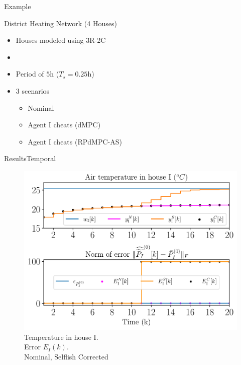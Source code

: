 \documentclass[aspectratio=169]{beamer}
\begin{document}
\begin{frame}{Example}
\begin{minipage}[c]{.35\textwidth}
{\begin{tikzpicture}[node distance=.5cm and .75cm,scale=1]
      \end{tikzpicture}
    }
  \end{minipage}
  \hfill
  \begin{minipage}[c]{.6\textwidth}
    \begin{exampleblock}{District Heating Network (4 Houses)}
      \begin{itemize}
        \item Houses modeled using 3R-2C
        \item {}
        \item Period of ${5} \mathrm{h}$ (${T_{s}=0.25\mathrm{h}}$)
        \item 3 scenarios
              \begin{itemize}
                \item[\encircle{N}] Nominal
                \item[\encircle{C}] Agent I cheats (dMPC)
                \item[\encircle{S}] Agent I cheats (RPdMPC-AS)
              \end{itemize}
      \end{itemize}
    \end{exampleblock}
  \end{minipage}
\end{frame}

\begin{frame}{Results}{Temporal}
  \begin{figure}[h]
    \centering
    \includegraphics[width=.5\textwidth,trim=0 .3cm 0 .2cm,clip]{../img/resilient_ineq/ErrorWX_command_normErrH.pdf}
    \caption*{Temperature in house I. \\Error  $E_{I}(k)$.\\ {} Nominal, {} Selflish {} Corrected}
  \end{figure}
\end{frame}
\end{document}
